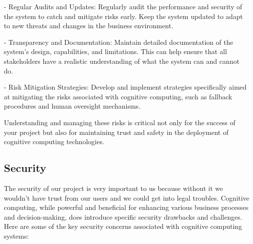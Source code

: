 \documentclass{article}
\begin{document}
  - Regular Audits and Updates: Regularly audit the performance and security of the system to catch and mitigate risks early. Keep the system updated to adapt to new threats and changes in the business environment.

  - Transparency and Documentation: Maintain detailed documentation of the system's design, capabilities, and limitations. This can help ensure that all stakeholders have a realistic understanding of what the system can and cannot do.

  - Risk Mitigation Strategies: Develop and implement strategies specifically aimed at mitigating the risks associated with cognitive computing, such as fallback procedures and human oversight mechanisms.

  Understanding and managing these risks is critical not only for the success of your project but also for maintaining trust and safety in the deployment of cognitive computing technologies.

\subsection{Security}

The security of our project is very important to us because without it we wouldn't have  trust from our users and we could get into legal troubles.
Cognitive computing, while powerful and beneficial for enhancing various business processes and decision-making, does introduce specific security drawbacks and challenges. Here are some of the key security concerns associated with cognitive computing systems:
\end{document}
